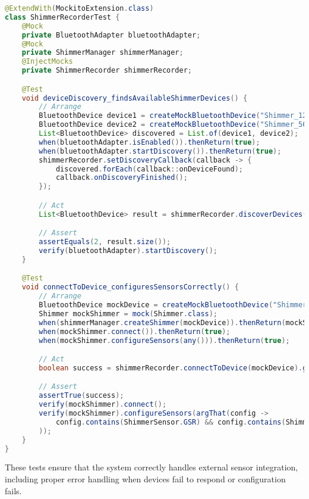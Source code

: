 \documentclass[11pt,a4paper]{report}
\begin{document}
\begin{lstlisting}[language=Java]
@ExtendWith(MockitoExtension.class)
class ShimmerRecorderTest {
    @Mock
    private BluetoothAdapter bluetoothAdapter;
    @Mock
    private ShimmerManager shimmerManager;
    @InjectMocks
    private ShimmerRecorder shimmerRecorder;

    @Test
    void deviceDiscovery_findsAvailableShimmerDevices() {  
        // Arrange  
        BluetoothDevice device1 = createMockBluetoothDevice("Shimmer_1234");  
        BluetoothDevice device2 = createMockBluetoothDevice("Shimmer_5678");  
        List<BluetoothDevice> discovered = List.of(device1, device2);  
        when(bluetoothAdapter.isEnabled()).thenReturn(true);  
        when(bluetoothAdapter.startDiscovery()).thenReturn(true);  
        shimmerRecorder.setDiscoveryCallback(callback -> {  
            discovered.forEach(callback::onDeviceFound);  
            callback.onDiscoveryFinished();  
        });  

        // Act  
        List<BluetoothDevice> result = shimmerRecorder.discoverDevices().get();  

        // Assert  
        assertEquals(2, result.size());  
        verify(bluetoothAdapter).startDiscovery();  
    }

    @Test
    void connectToDevice_configuresSensorsCorrectly() {  
        // Arrange  
        BluetoothDevice mockDevice = createMockBluetoothDevice("Shimmer_1234");  
        Shimmer mockShimmer = mock(Shimmer.class);  
        when(shimmerManager.createShimmer(mockDevice)).thenReturn(mockShimmer);  
        when(mockShimmer.connect()).thenReturn(true);  
        when(mockShimmer.configureSensors(any())).thenReturn(true);  

        // Act  
        boolean success = shimmerRecorder.connectToDevice(mockDevice).get();  

        // Assert  
        assertTrue(success);  
        verify(mockShimmer).connect();  
        verify(mockShimmer).configureSensors(argThat(config ->  
            config.contains(ShimmerSensor.GSR) && config.contains(ShimmerSensor.ACCELEROMETER)  
        ));  
    }  
}
\end{lstlisting}
These tests ensure that the system correctly handles external sensor integration, including proper error handling when devices fail to respond or configuration fails.
\end{document}
